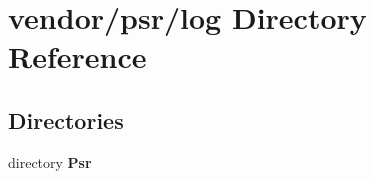 \section{vendor/psr/log Directory Reference}
\label{dir_1c219ec1c94142a96d28ddd4b53badd0}
\subsection*{Directories}
\begin{DoxyCompactItemize}
\item 
directory {\bf Psr}
\end{DoxyCompactItemize}
